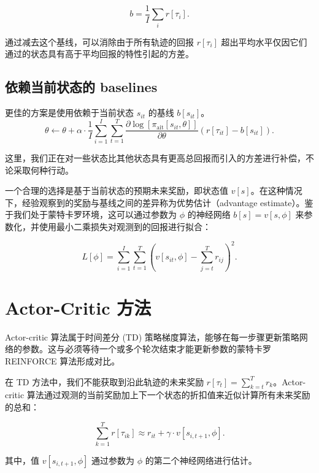 \begin{equation}
b = \frac{1}{I} \sum_{i} r[\tau_{i}]. 
\end{equation}

通过减去这个基线，可以消除由于所有轨迹的回报 \(r[\tau_i]\) 超出平均水平仅因它们通过的状态具有高于平均回报的特性引起的方差。

\subsection{依赖当前状态的 baselines}
更佳的方案是使用依赖于当前状态 \(s_{it}\) 的基线 \(b[s_{it}]\)。
\begin{equation}
\theta \leftarrow \theta + \alpha \cdot \frac{1}{I} \sum_{i=1}^{I} \sum_{t=1}^{T} \frac{\partial \log[\pi_{\text{ait}}[s_{it}, \theta]]}{\partial \theta} (r[\tau_{it}] - b[s_{it}]). 
\end{equation}

这里，我们正在对一些状态比其他状态具有更高总回报而引入的方差进行补偿，不论采取何种行动。

一个合理的选择是基于当前状态的预期未来奖励，即状态值 \(v[s]\)。在这种情况下，经验观察到的奖励与基线之间的差异称为优势估计（advantage estimate）。鉴于我们处于蒙特卡罗环境，这可以通过参数为 \(\phi\) 的神经网络 \(b[s] = v[s, \phi]\) 来参数化，并使用最小二乘损失对观测到的回报进行拟合：

\begin{equation}
L[\phi] = \sum_{i=1}^{I} \sum_{t=1}^{T} \left( v[s_{it}, \phi] - \sum_{j=t}^{T} r_{ij} \right)^2. 
\end{equation}

\section{Actor-Critic 方法}
Actor-critic 算法属于时间差分 (TD) 策略梯度算法，能够在每一步骤更新策略网络的参数。这与必须等待一个或多个轮次结束才能更新参数的蒙特卡罗 REINFORCE 算法形成对比。

在 TD 方法中，我们不能获取到沿此轨迹的未来奖励 \(r[\tau_t] = \sum_{k=t}^T r_k\)。Actor-critic 算法通过观测的当前奖励加上下一个状态的折扣值来近似计算所有未来奖励的总和：

\begin{equation}
\sum_{k=1}^{T} r[\tau_{ik}] \approx r_{it} + \gamma \cdot v[s_{i,t+1}, \phi]. 
\end{equation}

其中，值 \(v[s_{i,t+1}, \phi]\) 通过参数为 \(\phi\) 的第二个神经网络进行估计。

